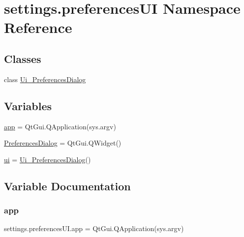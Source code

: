 \hypertarget{a00060}{}\section{settings.\+preferences\+UI Namespace Reference}
\label{a00060}
\subsection*{Classes}
\begin{DoxyCompactItemize}
\item 
class \hyperlink{a00106}{Ui\+\_\+\+Preferences\+Dialog}
\end{DoxyCompactItemize}
\subsection*{Variables}
\begin{DoxyCompactItemize}
\item 
\hyperlink{a00060_a827bf1bd672334a2a55713a2a33e610d}{app} = Qt\+Gui.\+Q\+Application(sys.\+argv)
\item 
\hyperlink{a00060_a70162ca377a00273f0795162093f7958}{Preferences\+Dialog} = Qt\+Gui.\+Q\+Widget()
\item 
\hyperlink{a00060_ae448bdbd0fb6bba061e4735237500ea5}{ui} = \hyperlink{a00106}{Ui\+\_\+\+Preferences\+Dialog}()
\end{DoxyCompactItemize}


\subsection{Variable Documentation}
\hypertarget{a00060_a827bf1bd672334a2a55713a2a33e610d}{}\label{a00060_a827bf1bd672334a2a55713a2a33e610d} 
\subsubsection{\texorpdfstring{app}{app}}
{\footnotesize\ttfamily settings.\+preferences\+U\+I.\+app = Qt\+Gui.\+Q\+Application(sys.\+argv)}

\hypertarget{a00060_a70162ca377a00273f0795162093f7958}{}\label{a00060_a70162ca377a00273f0795162093f7958} 
